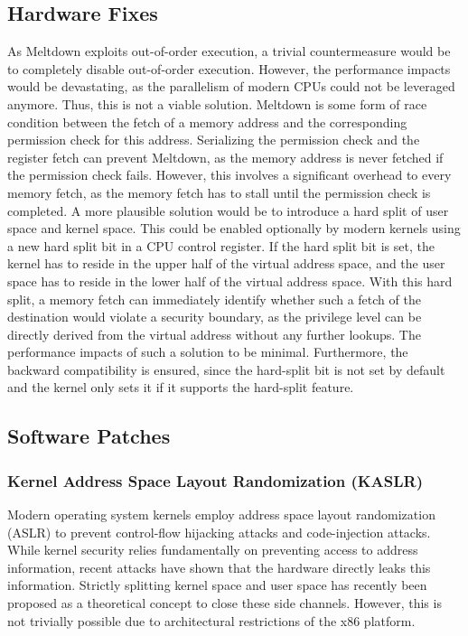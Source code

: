 \documentclass[runningheads]{llncs}
\begin{document}
\subsection{Hardware Fixes}
As Meltdown exploits out-of-order execution, a trivial countermeasure would be to completely disable out-of-order execution. However, the performance impacts would be devastating, as the parallelism of modern CPUs could not be leveraged anymore. Thus, this is not a viable solution.
Meltdown is some form of race condition between the fetch of a memory address and the corresponding permission check for this address. Serializing the permission check and the register fetch can prevent Meltdown, as the memory address is never fetched if the permission check fails. However, this involves a significant overhead to every memory fetch, as the memory fetch has to stall until the permission check is completed.
A more plausible solution would be to introduce a hard split of user space and kernel space. This could be enabled optionally by modern kernels using a new hard split bit in a CPU control register. If the hard split bit is set, the kernel has to reside in the upper half of the virtual address space, and the user space has to reside in the lower half of the virtual address space. With this hard split, a memory fetch can immediately identify whether such a fetch of the destination would violate a security boundary, as the privilege level can be directly derived from the virtual address without any further lookups. The performance impacts of such a solution to be minimal. Furthermore, the backward compatibility is ensured, since the hard-split bit is not set by default and the kernel only sets it if it supports the hard-split feature.

\subsection{Software Patches}
\subsubsection{Kernel Address Space Layout Randomization (KASLR)}

Modern operating system kernels employ address space layout randomization (ASLR) to prevent control-flow hijacking attacks and code-injection attacks. While kernel security relies fundamentally on preventing access to address information, recent attacks have shown that the hardware directly leaks this information. Strictly splitting kernel space and user space has recently been proposed as a theoretical concept to close these side channels. However, this is not trivially possible due to architectural restrictions of the x86 platform.
\end{document}

